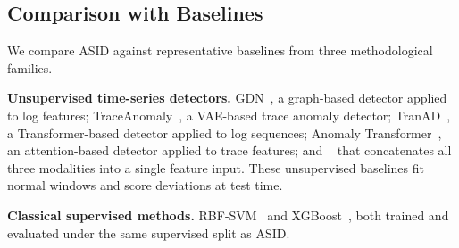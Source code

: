 \subsection{Comparison with Baselines}

We compare ASID against representative baselines from three methodological families.

\textbf{Unsupervised time-series detectors.}
GDN~\cite{deng2021graph}, a graph-based detector applied to log features;
TraceAnomaly~\cite{liu2020unsupervised}, a VAE-based trace anomaly detector;
TranAD~\cite{tuli2022tranad}, a Transformer-based detector applied to log sequences;
Anomaly Transformer~\cite{xu2022anomaly}, an attention-based detector applied to trace features;
and ~\cite{zhao2020mtadgat} that concatenates all three modalities into a single feature input.
These unsupervised baselines fit normal windows and score deviations at test time.


\textbf{Classical supervised methods.}
RBF-SVM~\cite{cortes1995support} and XGBoost~\cite{chen2016xgboost}, both trained and evaluated under the same supervised split as ASID.


